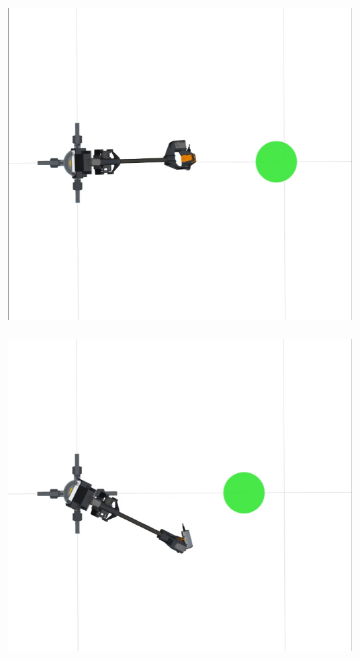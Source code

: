 \begin{figure}
  \centering
  \captionsetup{justification=centering}
  \begin{subfigure}[b]{0.4\linewidth}
    \label{subfig:top_view}
    \includegraphics[width=\linewidth]{obs_avoidance_fail1.png}
     \caption{}
  \end{subfigure}
  \begin{subfigure}[b]{0.4\linewidth}
    \includegraphics[width=\linewidth]{obs_avoidance_fail2.png}

\end{subfigure}
\end{figure}
